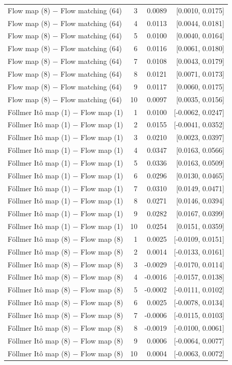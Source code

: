 \begin{tabular}{lrrr}
Flow map (8) $-$ Flow matching (64) & 3 & 0.0089 & [0.0010, 0.0175] \\
Flow map (8) $-$ Flow matching (64) & 4 & 0.0113 & [0.0044, 0.0181] \\
Flow map (8) $-$ Flow matching (64) & 5 & 0.0100 & [0.0040, 0.0164] \\
Flow map (8) $-$ Flow matching (64) & 6 & 0.0116 & [0.0061, 0.0180] \\
Flow map (8) $-$ Flow matching (64) & 7 & 0.0108 & [0.0043, 0.0179] \\
Flow map (8) $-$ Flow matching (64) & 8 & 0.0121 & [0.0071, 0.0173] \\
Flow map (8) $-$ Flow matching (64) & 9 & 0.0117 & [0.0060, 0.0175] \\
Flow map (8) $-$ Flow matching (64) & 10 & 0.0097 & [0.0035, 0.0156] \\
Föllmer Itô map (1) $-$ Flow map (1) & 1 & 0.0100 & [-0.0062, 0.0247] \\
Föllmer Itô map (1) $-$ Flow map (1) & 2 & 0.0155 & [-0.0041, 0.0352] \\
Föllmer Itô map (1) $-$ Flow map (1) & 3 & 0.0210 & [0.0023, 0.0397] \\
Föllmer Itô map (1) $-$ Flow map (1) & 4 & 0.0347 & [0.0163, 0.0566] \\
Föllmer Itô map (1) $-$ Flow map (1) & 5 & 0.0336 & [0.0163, 0.0509] \\
Föllmer Itô map (1) $-$ Flow map (1) & 6 & 0.0296 & [0.0130, 0.0465] \\
Föllmer Itô map (1) $-$ Flow map (1) & 7 & 0.0310 & [0.0149, 0.0471] \\
Föllmer Itô map (1) $-$ Flow map (1) & 8 & 0.0271 & [0.0146, 0.0394] \\
Föllmer Itô map (1) $-$ Flow map (1) & 9 & 0.0282 & [0.0167, 0.0399] \\
Föllmer Itô map (1) $-$ Flow map (1) & 10 & 0.0254 & [0.0151, 0.0359] \\
Föllmer Itô map (8) $-$ Flow map (8) & 1 & 0.0025 & [-0.0109, 0.0151] \\
Föllmer Itô map (8) $-$ Flow map (8) & 2 & 0.0014 & [-0.0133, 0.0161] \\
Föllmer Itô map (8) $-$ Flow map (8) & 3 & -0.0029 & [-0.0170, 0.0114] \\
Föllmer Itô map (8) $-$ Flow map (8) & 4 & -0.0016 & [-0.0157, 0.0138] \\
Föllmer Itô map (8) $-$ Flow map (8) & 5 & -0.0002 & [-0.0111, 0.0102] \\
Föllmer Itô map (8) $-$ Flow map (8) & 6 & 0.0025 & [-0.0078, 0.0134] \\
Föllmer Itô map (8) $-$ Flow map (8) & 7 & -0.0006 & [-0.0115, 0.0103] \\
Föllmer Itô map (8) $-$ Flow map (8) & 8 & -0.0019 & [-0.0100, 0.0061] \\
Föllmer Itô map (8) $-$ Flow map (8) & 9 & 0.0006 & [-0.0064, 0.0077] \\
Föllmer Itô map (8) $-$ Flow map (8) & 10 & 0.0004 & [-0.0063, 0.0072] \\
\bottomrule
\end{tabular}
